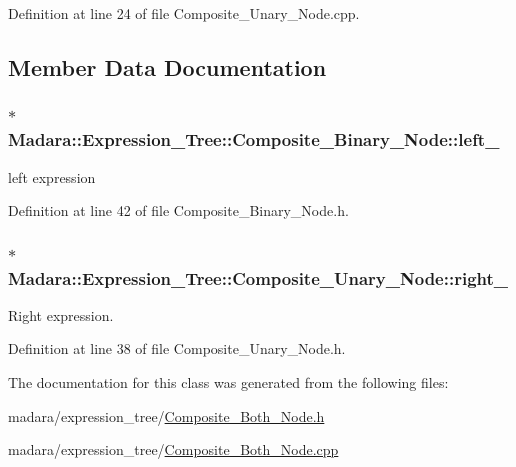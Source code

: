 Definition at line 24 of file Composite\_\-Unary\_\-Node.cpp.



\subsection{Member Data Documentation}
\hypertarget{classMadara_1_1Expression__Tree_1_1Composite__Binary__Node_acac60a70beb2484737e6e7161edb2d1b}{
\subsubsection[{left\_\-}]{$\ast$ {\bf Madara::Expression\_\-Tree::Composite\_\-Binary\_\-Node::left\_\-}}}
\label{df/d55/classMadara_1_1Expression__Tree_1_1Composite__Binary__Node_acac60a70beb2484737e6e7161edb2d1b}


left expression 



Definition at line 42 of file Composite\_\-Binary\_\-Node.h.

\hypertarget{classMadara_1_1Expression__Tree_1_1Composite__Unary__Node_a077b7bd1b52df6f5c6adfde735556a68}{
\subsubsection[{right\_\-}]{$\ast$ {\bf Madara::Expression\_\-Tree::Composite\_\-Unary\_\-Node::right\_\-}}}
\label{d3/dc7/classMadara_1_1Expression__Tree_1_1Composite__Unary__Node_a077b7bd1b52df6f5c6adfde735556a68}


Right expression. 



Definition at line 38 of file Composite\_\-Unary\_\-Node.h.



The documentation for this class was generated from the following files:\begin{DoxyCompactItemize}
\item 
madara/expression\_\-tree/\hyperlink{Composite__Both__Node_8h}{Composite\_\-Both\_\-Node.h}\item 
madara/expression\_\-tree/\hyperlink{Composite__Both__Node_8cpp}{Composite\_\-Both\_\-Node.cpp}\end{DoxyCompactItemize}
